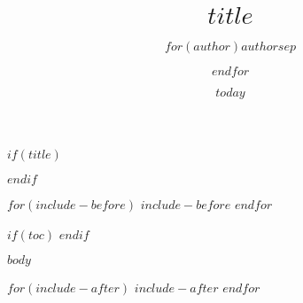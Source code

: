 \documentclass{book}
\title{$title$}
\author{$for(author)$$author$$sep$ \and $endfor$}
\author{}
\date{$today$}
\begin{document}
$if(title)$
\maketitle
$endif$

\setcounter{page}{1}


\clearpage

$for(include-before)$
$include-before$
$endfor$

$if(toc)$
{
\hypersetup{linkcolor=black}
\tableofcontents
\clearpage
}
$endif$

\setcounter{page}{1}
\raggedbottom
\raggedright

$body$

$for(include-after)$
$include-after$
$endfor$
\end{document}
